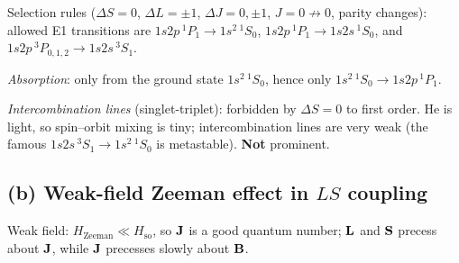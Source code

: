 \documentclass[11pt]{article}
\begin{document}
\begin{center}
\end{center}

Selection rules ($\Delta S=0$, $\Delta L=\pm 1$, $\Delta J=0,\pm 1$, $J=0\not\to 0$, parity changes):
allowed E1 transitions are $1s2p\,{}^1P_1\!\to\!1s^2\,{}^1S_0$, $1s2p\,{}^1P_1\!\to\!1s2s\,{}^1S_0$, and $1s2p\,{}^3P_{0,1,2}\!\to\!1s2s\,{}^3S_1$.

\textit{Absorption}: only from the ground state $1s^2\,{}^1S_0$, hence only $1s^2\,{}^1S_0\!\to\!1s2p\,{}^1P_1$.

\textit{Intercombination lines} (singlet-triplet): forbidden by $\Delta S=0$ to first order. He is light, so spin--orbit mixing is tiny; intercombination lines are very weak (the famous $1s2s\,{}^3S_1\!\to\!1s^2\,{}^1S_0$ is metastable). \textbf{Not} prominent.

\subsection*{(b) Weak-field Zeeman effect in $LS$ coupling}

Weak field: $H_\text{Zeeman}\ll H_\text{so}$, so $\vb J$ is a good quantum number; $\vb L$ and $\vb S$ precess about $\vb J$, while $\vb J$ precesses slowly about $\vb B$.
\end{document}
